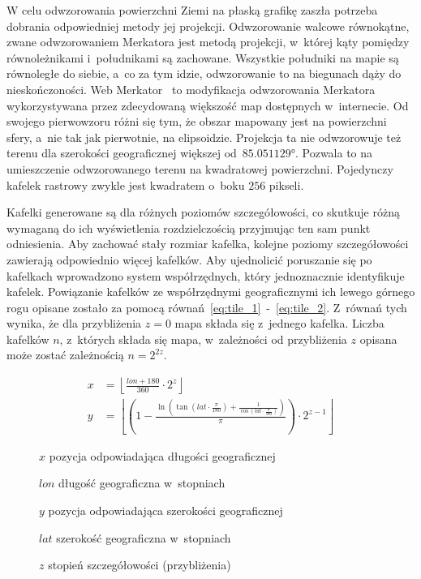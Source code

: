 W celu odwzorowania powierzchni Ziemi na płaską grafikę zaszła potrzeba dobrania odpowiedniej metody jej projekcji. Odwzorowanie walcowe równokątne, zwane odwzorowaniem Merkatora jest metodą projekcji, w~której kąty pomiędzy równoleżnikami i~południkami są zachowane. Wszystkie południki na mapie są równoległe do siebie, a~co za tym idzie, odwzorowanie to na biegunach dąży do nieskończoności. Web Merkator~\cite{Mercator} to modyfikacja odwzorowania Merkatora wykorzystywana przez zdecydowaną większość map dostępnych w~internecie. Od swojego pierwowzoru różni się tym, że obszar mapowany jest na powierzchni sfery, a~nie tak jak pierwotnie, na elipsoidzie. Projekcja ta nie odwzorowuje też terenu dla szerokości geograficznej większej od~$\ang{85.051129}$. Pozwala to na umieszczenie odwzorowanego terenu na kwadratowej powierzchni. Pojedynczy kafelek rastrowy zwykle jest kwadratem o~boku $256$ pikseli.

Kafelki generowane są dla różnych poziomów szczegółowości, co skutkuje różną wymaganą do ich wyświetlenia rozdzielczością przyjmując ten sam punkt odniesienia. Aby zachować stały rozmiar kafelka, kolejne poziomy szczegółowości zawierają odpowiednio więcej kafelków. Aby ujednolicić poruszanie się po kafelkach wprowadzono system współrzędnych, który jednoznacznie identyfikuje kafelek. Powiązanie kafelków ze współrzędnymi geograficznymi ich lewego górnego rogu opisane zostało za pomocą równań~\ref{eq:tile_1}~-~\ref{eq:tile_2}. Z~równań tych wynika, że dla przybliżenia $z = 0$ mapa składa się z~jednego kafelka. Liczba kafelków $n$, z~których składa się mapa, w~zależności od przybliżenia $z$ opisana może zostać zależnością $n = 2^{2z}$.

\begin{samepage}
  \begin{figure}[h]
  \begin{align}
      \label{eq:tile_1}
      x &= \left\lfloor \frac{lon + 180}{360} \cdot 2^z \right\rfloor \\
      \label{eq:tile_2}
      y &=
          \left\lfloor
              \left(
                  1 - \frac{
                      \ln \left(
                          \tan \left(
                              lat \cdot \frac{\pi}{180}
                          \right) + \frac{1}{\cos \left( lat \cdot \frac{\pi}{180} \right)}
                      \right)
                  }{\pi}
              \right) \cdot 2^{z - 1}
          \right\rfloor
  \end{align}
  \begin{eqexpl}[25mm]
      \item {$x$} pozycja odpowiadająca długości geograficznej
      \item {$lon$} długość geograficzna w~stopniach
      \item {$y$} pozycja odpowiadająca szerokości geograficznej
      \item {$lat$} szerokość geograficzna w~stopniach
      \item {$z$} stopień szczegółowości (przybliżenia)
  \end{eqexpl}
  \vspace{\baselineskip}
\end{figure}
\end{samepage}

